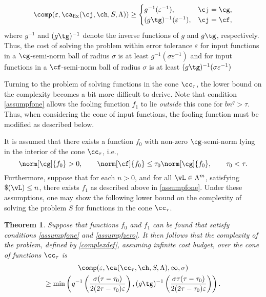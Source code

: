 \documentclass[final]{elsarticle}
\newtheorem{theorem}{Theorem}
\theoremstyle{definition}
\theoremstyle{remark}
\DeclareMathOperator{\fix}{fix}
\begin{document}
\[
\comp(\varepsilon,\ca_{\fix}(\cj,\ch,S,\Lambda)) \ge
\begin{cases} g^{-1}(\varepsilon^{-1}), & \cj=\cg,\\
(g\tg)^{-1}(\varepsilon^{-1}), & \cj=\cf,
\end{cases}
\]
where $g^{-1}$ and $(g\tg)^{-1}$ denote the inverse functions of $g$ and $g\tg$, respectively.
Thus, the cost of solving the problem within error tolerance $\varepsilon$ for input functions in a $\cg$-semi-norm ball of radius $\sigma$ is at least $g^{-1}(\sigma\varepsilon^{-1})$ and for input functions in a $\cf$-semi-norm ball of radius $\sigma$ is at least $(g\tg)^{-1}(\sigma\varepsilon^{-1})$

Turning to the problem of solving functions in the cone $\cc_{\tau}$, the lower bound on the complexity becomes a bit more difficult to derive.  Note that condition \eqref{assumpfone} allows the fooling function $f_1$ to lie \emph{outside} this cone for $bn^q > \tau$.  Thus, when considering the cone of input functions, the fooling function must be modified as described below.

It is assumed that there exists a function $f_0$ with non-zero $\cg$-semi-norm lying in the interior of the cone $\cc_{\tau}$, i.e.,
\begin{equation}
\label{assumpfzero}
\norm[\cg]{f_{0}} > 0, \qquad \norm[\cf]{f_{0}} \le \tau_0 \norm[\cg]{f_{0}}, \qquad \tau_0 < \tau.
\end{equation}
Furthermore, suppose that for each $n>0$, and for all $\vL \in \Lambda^m$, satisfying $\$(\vL)\le n$, there exists $f_1$ as described above in \eqref{assumpfone}. Under these assumptions, one may show the following lower bound on the complexity of solving the problem $S$ for functions in the cone $\cc_{\tau}$.

\begin{theorem} \label{complowbd} Suppose that functions $f_{0}$ and $f_1$ can be found that satisfy conditions \eqref{assumpfone} and \eqref{assumpfzero}.  It then follows that the complexity of the problem, defined by \eqref{complexdef}, assuming infinite cost budget, over the cone of functions $\cc_{\tau}$ is
\begin{multline*}
\comp(\varepsilon,\ca(\cc_{\tau},\ch,S,\Lambda),\infty,\sigma) \\
\ge \min\left(g^{-1}\left(\frac{\sigma(\tau-\tau_0)}{2(2\tau-\tau_0)\varepsilon}\right), (g\tg)^{-1}\left(\frac{\sigma\tau(\tau-\tau_0)}{2(2\tau-\tau_0)\varepsilon}\right) \right).
\end{multline*}
\end{theorem}
\end{document}
